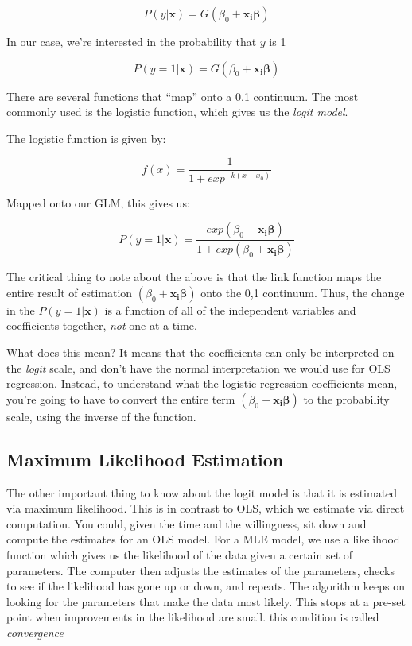 \documentclass[12pt]{article}
\begin{document}
\begin{equation*}
  P(y|\mathbf{x})=G(\beta_0 + \mathbf{x_i\beta})
\end{equation*}

In our case, we're interested in the probability that $y$ is 1

\begin{equation*}
  P(y=1|\mathbf{x})=G(\beta_0 + \mathbf{x_i\beta})
\end{equation*}

There are several functions that ``map'' onto a 0,1 continuum. The
most commonly used is the logistic function, which gives us the
\textit{logit model}.

The logistic function is given by:

\begin{equation*}
  f(x)=\frac{1}{1+exp^{-k(x-x_0)}}
\end{equation*}

Mapped onto our GLM, this gives us: 

\begin{equation*}
  P(y=1|\mathbf{x})=\frac{exp(\beta_0 + \mathbf{x_i\beta})}{1+exp(\beta_0 + \mathbf{x_i\beta})}
\end{equation*}

The critical thing to note about the above is that the link function
maps the entire result of estimation $(\beta_0 + \mathbf{x_i\beta})$
onto the 0,1 continuum. Thus, the change in the $P(y=1|\mathbf{x})$ is
a function of all of the independent variables and coefficients
together, \textit{not} one at a time. 

What does this mean? It means that the coefficients can only be
interpreted on the \textit{logit} scale, and don't have the normal
interpretation we would use for OLS regression. Instead, to understand
what the logistic regression coefficients mean, you're going to have
to convert the entire term $(\beta_0 + \mathbf{x_i\beta})$ to the
probability scale, using the inverse of the function. 

\subsection{Maximum Likelihood Estimation}

The other important thing to know about the logit model is that it is
estimated via maximum likelihood. This is in contrast to OLS, which we
estimate via direct computation. You could, given the time and the
willingness, sit down and compute the estimates for an OLS model. For
a MLE model, we use a likelihood function which gives us the
likelihood of the data given a certain set of parameters. The computer then
adjusts the estimates of the parameters, checks to see if the
likelihood has gone up or down, and repeats. The algorithm keeps on
looking for the parameters that make the data most likely. This stops
at a pre-set point when improvements in the likelihood are small. this
condition is called \textit{convergence}
\end{document}

